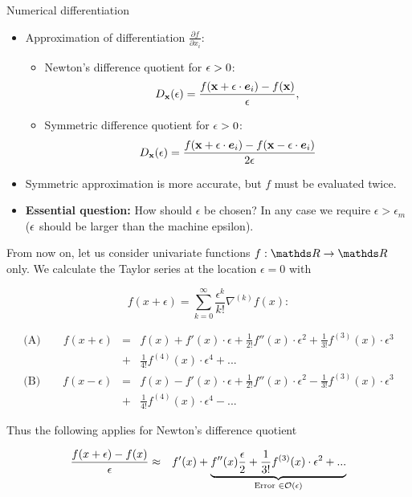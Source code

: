 \documentclass[11pt,compress,t,notes=noshow, xcolor=table]{beamer}
\begin{document}
  \begin{vbframe}{Numerical differentiation}
  \begin{itemize}
  \item Approximation of differentiation $\frac{\partial f}{\partial
  x_{i}}$:
  \begin{itemize}
    \item Newton's difference quotient for $\epsilon > 0$: 
    $$
    D_{\mathbf{x}}(\epsilon) = \frac{f(\mathbf{x} + \epsilon\cdot \bm{e}_i) -
    f(\mathbf{x})}{\epsilon}, 
    $$
    \item Symmetric difference quotient for $\epsilon > 0$: 
    $$
    D_{\mathbf{x}}(\epsilon) = \frac{f(\mathbf{x} + \epsilon\cdot \bm{e}_i) - f(\mathbf{x} - \epsilon
    \cdot \bm{e}_{i})}{2\epsilon}
    $$
  \end{itemize}
  \item Symmetric approximation is more accurate, but $f$ must be evaluated twice.
  \item \textbf{Essential question:} How should $\epsilon$ be chosen? In any case we require $\epsilon > \epsilon_{m}$ ($\epsilon$ should be larger than the machine epsilon).
  \end{itemize}
  
  \framebreak
  
  From now on, let us consider univariate functions $f: \R \to \R$ only. We calculate the Taylor series at the location $\epsilon = 0$ with
  
  $$
    f(x + \epsilon) = \sum_{k=0}^\infty \frac{\epsilon^k}{k!} \nabla^{(k)} f(x):
  $$
  
  \begin{eqnarray*}
  \text{(A)} \qquad f(x + \epsilon) &=& f(x) + f'(x) \cdot \epsilon + \frac{1}{2 !}f''(x)\cdot\epsilon^2 + \frac{1}{3 !}f^{(3)}(x)\cdot\epsilon^3 \\ &+& \frac{1}{4 !}f^{(4)}(x)\cdot\epsilon^4 + ... \\
  \text{(B)} \qquad  f(x - \epsilon) &=& f(x) - f'(x) \cdot \epsilon + \frac{1}{2 !}f''(x)\cdot\epsilon^2 - \frac{1}{3 !}f^{(3)}(x)\cdot\epsilon^3 \\ &+& \frac{1}{4 !}f^{(4)}(x)\cdot\epsilon^4 - ...
  \end{eqnarray*}
  
  \framebreak
  
  Thus the following applies for Newton's difference quotient
  
  \begin{footnotesize}
  \begin{eqnarray*}
  \frac{f(x + \epsilon) - f(x)}{\epsilon} &\approx&
  f\!\,'(x) +
  \underbrace{f\!\,''(x)\frac{\epsilon}{2} + \frac{1}{3 !}f^{(3)}(x)\cdot\epsilon^2 + ... }_{\text{Error } \in \mathcal{O}(\epsilon)}
  \end{eqnarray*}
  \end{footnotesize}
  

\end{vbframe}
\end{document}
